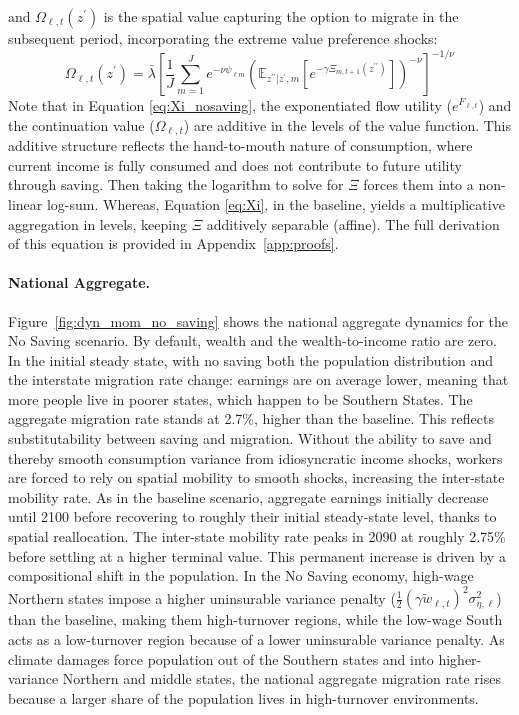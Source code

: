 \documentclass[12pt, a4paper]{article}
\begin{document}
and $\Omega_{\ell,t}(z^\prime)$ is the spatial value capturing the option to migrate in the subsequent period, incorporating the extreme value preference shocks:
\begin{equation}
\Omega_{\ell,t}(z^\prime) = \bar{\lambda} \left[ \frac{1}{J} \sum_{m=1}^J e^{-\nu \psi_{\ell m}} \left( \mathbb{E}_{z^{\prime\prime}|z^\prime, m} \left[ e^{-\gamma \Xi_{m,t+1}(z^{\prime\prime})} \right] \right)^{-\nu} \right]^{-1/\nu}
\end{equation}
Note that in Equation \ref{eq:Xi_nosaving}, the exponentiated flow utility ($e^{F_{\ell,t}}$) and the continuation value ($\Omega_{\ell,t}$) are additive in the levels of the value function. This additive structure reflects the hand-to-mouth nature of consumption, where current income is fully consumed and does not contribute to future utility through saving. Then taking the logarithm to solve for $\Xi$ forces them into a non-linear log-sum. Whereas, Equation \ref{eq:Xi}, in the baseline, yields a multiplicative aggregation in levels, keeping $\Xi$ additively separable (affine). The full derivation of this equation is provided in Appendix~\ref{app:proofs}.


\paragraph{National Aggregate.} Figure~\ref{fig:dyn_mom_no_saving} shows the national aggregate dynamics for the No Saving scenario. By default, wealth and the wealth-to-income ratio are zero. In the initial steady state, with no saving both the population distribution and the interstate migration rate change: earnings are on average lower, meaning that more people live in poorer states, which happen to be Southern States. The aggregate migration rate stands at 2.7\%, higher than the baseline. This reflects substitutability between saving and migration. Without the ability to save and thereby smooth consumption variance from idiosyncratic income shocks, workers are forced to rely on spatial mobility to smooth shocks, increasing the inter-state mobility rate. As in the baseline scenario, aggregate earnings initially decrease until 2100 before recovering to roughly their initial steady-state level, thanks to spatial reallocation. The inter-state mobility rate peaks in 2090 at roughly 2.75\% before settling at a higher terminal value. This permanent increase is driven by a compositional shift in the population. In the No Saving economy, high-wage Northern states impose a higher uninsurable variance penalty ($\frac{1}{2}(\gamma \tilde{w}_{\ell,t})^2 \sigma_{\eta,\ell}^2$) than the baseline, making them high-turnover regions, while the low-wage South acts as a low-turnover region because of a lower uninsurable variance penalty. As climate damages force population out of the Southern states and into higher-variance Northern and middle states, the national aggregate migration rate rises because a larger share of the population lives in high-turnover environments.
\end{document}
